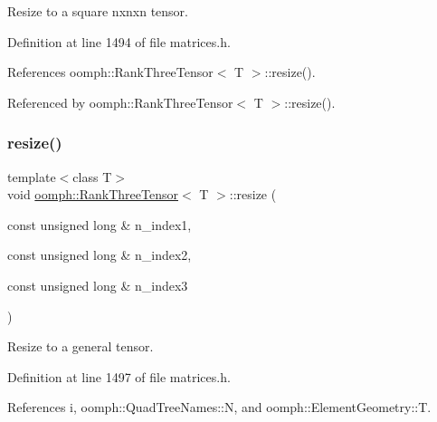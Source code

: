 Resize to a square nxnxn tensor. 



Definition at line 1494 of file matrices.\+h.



References oomph\+::\+Rank\+Three\+Tensor$<$ T $>$\+::resize().



Referenced by oomph\+::\+Rank\+Three\+Tensor$<$ T $>$\+::resize().

\mbox{\label{classoomph_1_1RankThreeTensor_ac192a93e6971712de84c705895443544}} 
\subsubsection{\texorpdfstring{resize()}{resize()}\hspace{0.1cm}{\footnotesize\ttfamily [2/3]}}
{\footnotesize\ttfamily template$<$class T$>$ \\
void \hyperlink{classoomph_1_1RankThreeTensor}{oomph\+::\+Rank\+Three\+Tensor}$<$ T $>$\+::resize (\begin{DoxyParamCaption}\item[{const unsigned long \&}]{n\+\_\+index1,  }\item[{const unsigned long \&}]{n\+\_\+index2,  }\item[{const unsigned long \&}]{n\+\_\+index3 }\end{DoxyParamCaption})\hspace{0.3cm}{\ttfamily [inline]}}



Resize to a general tensor. 



Definition at line 1497 of file matrices.\+h.



References i, oomph\+::\+Quad\+Tree\+Names\+::N, and oomph\+::\+Element\+Geometry\+::T.

\mbox{\label{classoomph_1_1RankThreeTensor_a2b7967ca1fb782b26d9b2d9f0d760d16}} 
